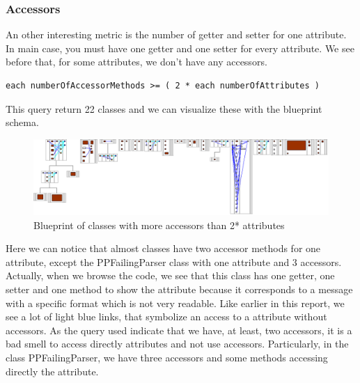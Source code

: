 \subsubsection{Accessors}
An other interesting metric is the number of getter and setter for one attribute.  In main case, you must have one getter and one setter for every attribute.  We see before that, for some attributes, we don't have any accessors. \\
\begin{lstlisting}
each numberOfAccessorMethods >= ( 2 * each numberOfAttributes ) 
\end{lstlisting}
This query return 22 classes and we can visualize these with the blueprint schema.\\
\begin{figure}[ht]
\centering
\label{more_access_blueprint}
\includegraphics[scale=0.35]{more_access_blueprint.png}
\caption{Blueprint of classes with more accessors than 2* attributes}
\end{figure}
Here we can notice that almost classes have two accessor methods for one attribute, except the PPFailingParser class with one attribute and 3 accessors.  Actually, when we browse the code, we see that this class has one getter, one setter and one method to show the attribute because it corresponds to a message with a specific format which is not very readable.  Like earlier in this report, we see a lot of light blue links, that symbolize an access to a attribute without accessors. As the query used indicate that we have, at least, two accessors, it is a bad smell to access directly attributes and not use accessors.  Particularly, in the class PPFailingParser, we have three accessors and some methods accessing directly the attribute.\\


